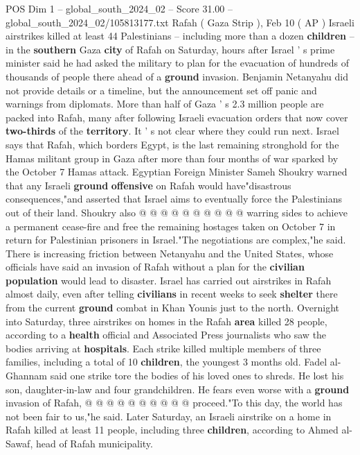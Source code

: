 \begin{textsample}{POS Dim 1 – global\_south\_2024\_02 – Score 31.00 – global\_south\_2024\_02/105813177.txt}  \label{ex:f1_pos_029}
Rafah ( Gaza Strip ), Feb 10 ( AP ) Israeli airstrikes killed at least 44 Palestinians -- including more than a dozen \textbf{children} -- in the \textbf{southern} Gaza \textbf{city} of Rafah on Saturday, hours after Israel ' s prime minister said he had asked the military to plan for the evacuation of hundreds of thousands of people there ahead of a \textbf{ground} invasion.
Benjamin Netanyahu did not provide details or a timeline, but the announcement set off panic and warnings from diplomats.
More than half of Gaza ' s 2.3 million people are packed into Rafah, many after following Israeli evacuation orders that now cover \textbf{two-thirds} of the \textbf{territory}.
It ' s not clear where they could run next.
Israel says that Rafah, which borders Egypt, is the last remaining stronghold for the Hamas militant group in Gaza after more than four months of war sparked by the October 7 Hamas attack.
Egyptian Foreign Minister Sameh Shoukry warned that any Israeli \textbf{ground} \textbf{offensive} on Rafah would have"disastrous consequences,"and asserted that Israel aims to eventually force the Palestinians out of their land.
Shoukry also @ @ @ @ @ @ @ @ @ @ warring sides to achieve a permanent cease-fire and free the remaining hostages taken on October 7 in return for Palestinian prisoners in Israel."The negotiations are complex,"he said.
There is increasing friction between Netanyahu and the United States, whose officials have said an invasion of Rafah without a plan for the \textbf{civilian} \textbf{population} would lead to disaster.
Israel has carried out airstrikes in Rafah almost daily, even after telling \textbf{civilians} in recent weeks to seek \textbf{shelter} there from the current \textbf{ground} combat in Khan Younis just to the north.
Overnight into Saturday, three airstrikes on homes in the Rafah \textbf{area} killed 28 people, according to a \textbf{health} official and Associated Press journalists who saw the bodies arriving at \textbf{hospitals}.
Each strike killed multiple members of three families, including a total of 10 \textbf{children}, the youngest 3 months old.
Fadel al-Ghannam said one strike tore the bodies of his loved ones to shreds.
He lost his son, daughter-in-law and four grandchildren.
He fears even worse with a \textbf{ground} invasion of Rafah, @ @ @ @ @ @ @ @ @ @ proceed."To this day, the world has not been fair to us,"he said.
Later Saturday, an Israeli airstrike on a home in Rafah killed at least 11 people, including three \textbf{children}, according to Ahmed al-Sawaf, head of Rafah municipality.

\end{textsample}
